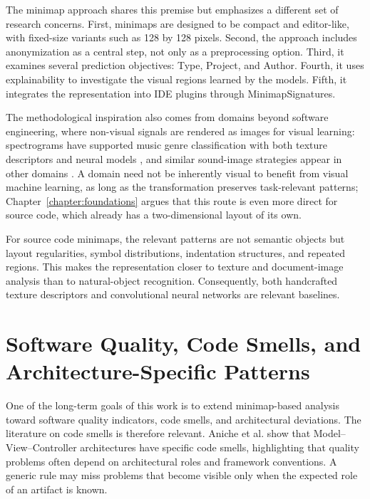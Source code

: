 The minimap approach shares this premise but emphasizes a different set of
research concerns. First, minimaps are designed to be compact and editor-like,
with fixed-size variants such as 128 by 128 pixels. Second, the approach includes
anonymization as a central step, not only as a preprocessing option. Third, it
examines several prediction objectives: Type, Project, and Author. Fourth, it
uses explainability to investigate the visual regions learned by the models.
Fifth, it integrates the representation into IDE plugins through
MinimapSignatures.

The methodological inspiration also comes from domains beyond software
engineering, where non-visual signals are rendered as images for visual
learning: spectrograms have supported music genre classification with both
texture descriptors and neural models
\cite{costa2011music,costa2012music,costa2017cnn}, and similar sound-image
strategies appear in other domains
\cite{nanni2018bird,pereira2019representation}. A domain need not be inherently
visual to benefit from visual machine learning, as long as the transformation
preserves task-relevant patterns; Chapter~\ref{chapter:foundations} argues that
this route is even more direct for source code, which already has a
two-dimensional layout of its own.

For source code minimaps, the relevant patterns are not semantic objects but
layout regularities, symbol distributions, indentation structures, and repeated
regions. This makes the representation closer to texture and document-image
analysis than to natural-object recognition. Consequently, both handcrafted
texture descriptors and convolutional neural networks are relevant baselines.

\section{Software Quality, Code Smells, and Architecture-Specific Patterns}

One of the long-term goals of this work is to extend minimap-based
analysis toward software quality indicators, code smells, and architectural
deviations. The literature on code smells is therefore relevant. Aniche et al.
\cite{aniche2018code} show that Model--View--Controller architectures have
specific code smells, highlighting that quality problems often depend on
architectural roles and framework conventions. A generic rule may miss problems
that become visible only when the expected role of an artifact is known.

